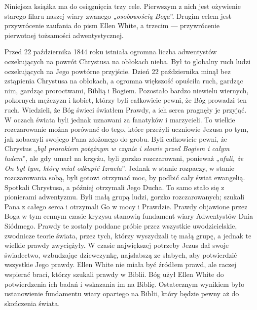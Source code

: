 

Niniejsza książka ma do osiągnięcia trzy cele. Pierwszym z nich jest ożywienie starego filaru naszej wiary zwanego „\textit{osobowością Boga}”. Drugim celem jest przywrócenie zaufania do pism Ellen White, a trzecim — przywrócenie pierwotnej tożsamości adwentystycznej.

Przed 22 października 1844 roku istniała ogromna liczba adwentystów oczekujących na powrót Chrystusa na obłokach nieba. Był to globalny ruch ludzi oczekujących na Jego powtórne przyjście. Dzień 22 października minął bez zstąpienia Chrystusa na obłokach, a ogromna większość opuściła ruch, gardząc nim, gardząc proroctwami, Biblią i Bogiem. Pozostało bardzo niewielu wiernych, pokornych mężczyzn i kobiet, którzy byli całkowicie pewni, że Bóg prowadzi ten ruch. Wiedzieli, że Bóg świeci światłem Prawdy, a ich serca pragnęły je przyjąć. W oczach świata byli jednak uznawani za fanatyków i marzycieli. To wielkie rozczarowanie można porównać do tego, które przeżyli uczniowie Jezusa po tym, jak zobaczyli swojego Pana złożonego do grobu. Byli całkowicie pewni, że Chrystus „\textit{był prorokiem potężnym w czynie i słowie przed Bogiem i całym ludem}”, ale gdy umarł na krzyżu, byli gorzko rozczarowani, ponieważ „\textit{ufali, że On był tym, który miał odkupić Izraela}”. Jednak w stanie rozpaczy, w stanie rozczarowania sobą, byli gotowi otrzymać moc, by podbić cały świat ewangelią. Spotkali Chrystusa, a później otrzymali Jego Ducha. To samo stało się z pionierami adwentyzmu. Byli małą grupą ludzi, gorzko rozczarowanych; szukali Pana z całego serca i otrzymali Go w mocy i Prawdzie. Prawdy objawione przez Boga w tym cennym czasie kryzysu stanowią fundament wiary Adwentystów Dnia Siódmego. Prawdy te zostały poddane próbie przez wszystkie uwodzicielskie, zwodnicze teorie świata, przez tych, którzy wyszydzali tę małą grupę, a jednak te wielkie prawdy zwyciężyły. W czasie największej potrzeby Jezus dał swoje świadectwo, wzbudzając dziewczynkę, najsłabszą ze słabych, aby potwierdzić wszystkie Jego prawdy. Ellen White nie miała być źródłem prawd, ale raczej wspierać braci, którzy szukali prawdy w Biblii. Bóg użył Ellen White do potwierdzenia ich badań i wskazania im na Biblię. Ostatecznym wynikiem było ustanowienie fundamentu wiary opartego na Biblii, który będzie pewny aż do skończenia świata.

